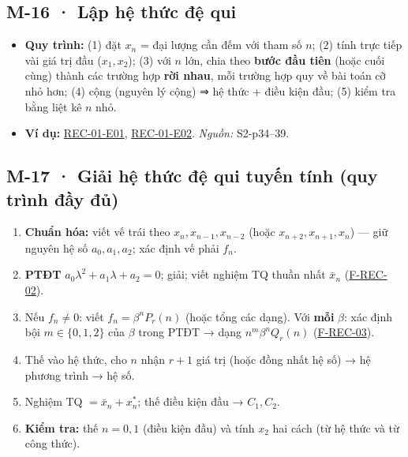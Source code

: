 \documentclass[
  10pt,
  twoside,openany]{book}
\providecommand{\tightlist}{%
  \setlength{\itemsep}{0pt}\setlength{\parskip}{0pt}}
\begin{document}
\hypertarget{M-16}{%
\subsection{M-16 · Lập hệ thức đệ qui}\label{M-16}}

\begin{itemize}
\tightlist
\item
  \textbf{Quy trình:} (1) đặt \(x_n\) = đại lượng cần đếm với tham số
  \(n\); (2) tính trực tiếp vài giá trị đầu (\(x_1, x_2\)); (3) với
  \(n\) lớn, chia theo \textbf{bước đầu tiên} (hoặc cuối cùng) thành các
  trường hợp \textbf{rời nhau}, mỗi trường hợp quy về bài toán cỡ nhỏ
  hơn; (4) cộng (nguyên lý cộng) ⇒ hệ thức + điều kiện đầu; (5) kiểm tra
  bằng liệt kê \(n\) nhỏ.
\item
  \textbf{Ví dụ:} \protect\hyperlink{REC-01-E01}{REC-01-E01},
  \protect\hyperlink{REC-01-E02}{REC-01-E02}. \emph{Nguồn:} S2-p34--39.
\end{itemize}

\hypertarget{M-17}{%
\subsection{M-17 · Giải hệ thức đệ qui tuyến tính (quy trình đầy
đủ)}\label{M-17}}

\begin{enumerate}
\def\labelenumi{\arabic{enumi}.}
\tightlist
\item
  \textbf{Chuẩn hóa:} viết vế trái theo \(x_{n}, x_{n-1}, x_{n-2}\)
  (hoặc \(x_{n+2}, x_{n+1}, x_n\)) --- giữ nguyên hệ số \(a_0,a_1,a_2\);
  xác định vế phải \(f_n\).
\item
  \textbf{PTĐT} \(a_0\lambda^2+a_1\lambda+a_2=0\); giải; viết nghiệm TQ
  thuần nhất \(\bar x_n\) (\protect\hyperlink{F-REC-02}{F-REC-02}).
\item
  Nếu \(f_n\ne0\): viết \(f_n=\beta^nP_r(n)\) (hoặc tổng các dạng). Với
  \textbf{mỗi} \(\beta\): xác định bội \(m\in\{0,1,2\}\) của \(\beta\)
  trong PTĐT → dạng \(n^m\beta^nQ_r(n)\)
  (\protect\hyperlink{F-REC-03}{F-REC-03}).
\item
  Thế vào hệ thức, cho \(n\) nhận \(r+1\) giá trị (hoặc đồng nhất hệ số)
  → hệ phương trình → hệ số.
\item
  Nghiệm TQ \(=\bar x_n+x_n^*\); thế điều kiện đầu → \(C_1,C_2\).
\item
  \textbf{Kiểm tra:} thế \(n=0,1\) (điều kiện đầu) và tính \(x_2\) hai
  cách (từ hệ thức và từ công thức).
\end{enumerate}
\end{document}
